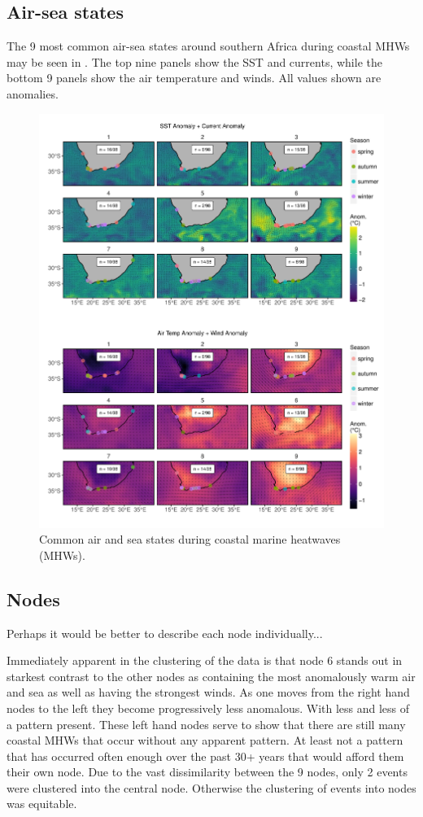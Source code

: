 \documentclass[a4paper,10pt,review]{elsarticle}
\begin{document}
\subsection{Air-sea states}
The 9 most common air-sea states around southern Africa during coastal MHWs may be seen in . The top nine panels show the SST and currents, while the bottom 9 panels show the air temperature and winds. All values shown are anomalies.

\begin{figure}
\includegraphics[width=1.0\textwidth]{figure_3.pdf}
\caption{Common air and sea states during coastal marine heatwaves (MHWs).}
\label{figure3}
\end{figure}

\subsection{Nodes}

Perhaps it would be better to describe each node individually...

Immediately apparent in the clustering of the data is that node 6 stands out in starkest contrast to the other nodes as containing the most anomalously warm air and sea as well as having the strongest winds. As one moves from the right hand nodes to the left they become progressively less anomalous. With less and less of a pattern present. These left hand nodes serve to show that there are still many coastal MHWs that occur without any apparent pattern. At least not a pattern that has occurred often enough over the past 30+ years that would afford them their own node. Due to the vast dissimilarity between the 9 nodes, only 2 events were clustered into the central node. Otherwise the clustering of events into nodes was equitable.
\end{document}
